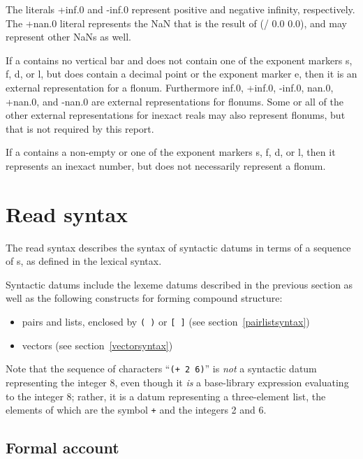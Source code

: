 The literals {\cf +inf.0} and {\cf -inf.0} represent positive and
negative infinity, respectively.  The {\cf +nan.0}
literal represents the NaN that is the result of {\cf (/ 0.0 0.0)},
and may represent other NaNs as well.

If a  contains no vertical bar
and does not contain one of the exponent markers {\cf s},
{\cf f}, {\cf d}, or {\cf l}, but does contain a decimal point or the
exponent marker {\cf e}, then it is an external representation for a
flonum.  Furthermore {\cf inf.0}, {\cf +inf.0}, {\cf -inf.0}, {\cf
  nan.0}, {\cf +nan.0}, and {\cf -nan.0} are external representations
for flonums.  Some or all of the other external representations for
inexact reals may also represent flonums, but that is not required by
this report.

If a  contains a non-empty  or
one of the exponent markers {\cf s}, {\cf f}, {\cf d}, or {\cf l},
then it represents an inexact number, but does not necessarily
represent a flonum.

\section{Read syntax}
\label{readsyntaxsection}

The read syntax describes the syntax of
syntactic datums in terms of a sequence of
s, as defined in the lexical syntax.

Syntactic datums include the lexeme datums described in the
previous section as well as the following constructs for forming
compound structure:
%
\begin{itemize}
\item pairs and lists, enclosed by \verb|( )| or \verb|[ ]| (see
  section~\ref{pairlistsyntax})
\item  vectors (see section~\ref{vectorsyntax})
\end{itemize}

Note that the sequence of characters ``{\tt(+ 2 6)}'' is {\em not} a
syntactic datum representing the integer 8, even though it {\em is} a
base-library expression evaluating to the integer 8; rather, it is a
datum representing a three-element list, the elements of which
are the symbol {\tt +} and the integers 2 and 6.

\subsection{Formal account}
\label{datumsyntax}

